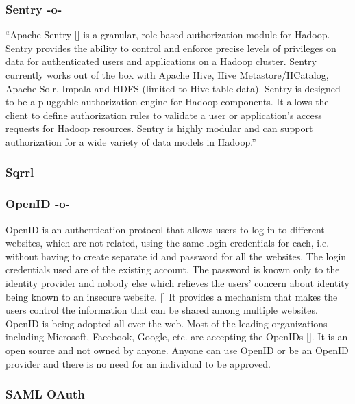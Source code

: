 \subsubsection{Sentry -o-}

``Apache Sentry [\cite{www-sentry}] is a granular, role-based
authorization module for Hadoop. Sentry provides the ability to
control and enforce precise levels of privileges on data for
authenticated users and applications on a Hadoop cluster. Sentry
currently works out of the box with Apache Hive, Hive
Metastore/HCatalog, Apache Solr, Impala and HDFS (limited to Hive
table data). Sentry is designed to be a pluggable authorization engine
for Hadoop components. It allows the client to define authorization
rules to validate a user or application's access requests for Hadoop
resources. Sentry is highly modular and can support authorization for
a wide variety of data models in Hadoop.''

\subsubsection{Sqrrl}
\subsubsection{OpenID -o-}

OpenID is an authentication protocol that allows users to log in to
different websites, which are not related, using the same login
credentials for each, i.e. without having to create separate id and
password for all the websites. The login credentials used are of the
existing account. The password is known only to the identity provider
and nobody else which relieves the users' concern about identity being
known to an insecure website. [\cite{ope1}] It provides a mechanism that
makes the users control the information that can be shared among
multiple websites. OpenID is being adopted all over the web. Most of
the leading organizations including Microsoft, Facebook, Google,
etc. are accepting the OpenIDs [\cite{ope2}]. It is an open source and
not owned by anyone. Anyone can use OpenID or be an OpenID provider
and there is no need for an individual to be approved.

\subsubsection{SAML OAuth}

